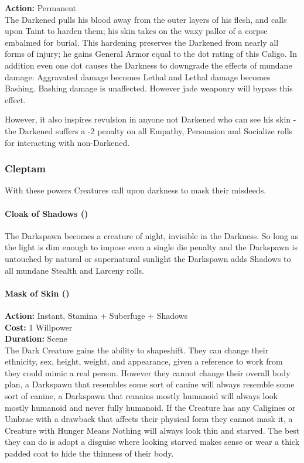 \noindent \textbf{Action:} Permanent\\

The Darkened pulls his blood away from the outer layers of his flesh, and calls upon Taint to harden them; his skin takes on the waxy pallor of a corpse embalmed for burial. This hardening preserves the Darkened from nearly all forms of injury; he gains General Armor equal to the dot rating of this Caligo. In addition even one dot causes the Darkness to downgrade the effects of mundane damage: Aggravated damage becomes Lethal and Lethal damage becomes Bashing. Bashing damage is unaffected. However jade weaponry will bypass this effect.

However, it also inspires revulsion in anyone not Darkened who can see his skin - the Darkened suffers a -2 penalty on all Empathy, Persuasion and Socialize rolls for interacting with non-Darkened.

\subsubsection*{Cleptam}

With these powers Creatures call upon darkness to mask their misdeeds. 

\paragraph*{Cloak of Shadows (\textbullet)}

The Darkspawn becomes a creature of night, invisible in the Darkness. So long as the light is dim enough to impose even a single die penalty and the Darkspawn is untouched by natural or supernatural sunlight the Darkspawn adds Shadows to all mundane Stealth and Larceny rolls.

\paragraph*{Mask of Skin (\textbullet\textbullet\textbullet)}

\noindent \textbf{Action:} Instant, Stamina + Suberfuge + Shadows\\

\noindent \textbf{Cost:} 1 Willpower\\

\noindent \textbf{Duration:} Scene \\

\noindent The Dark Creature gains the ability to shapeshift. They can change their ethnicity, sex, height, weight, and appearance, given a reference to work from they could mimic a real person. However they cannot change their overall body plan, a Darkspawn that resembles some sort of canine will always resemble some sort of canine, a Darkspawn that remains mostly humanoid will always look mostly humanoid and never fully humanoid. If the Creature has any Caligines or Umbrae with a drawback that affects their physical form they cannot mask it, a Creature with Hunger Means Nothing will always look thin and starved. The best they can do is adopt a disguise where looking starved makes sense or wear a thick padded coat to hide the thinness of their body.

